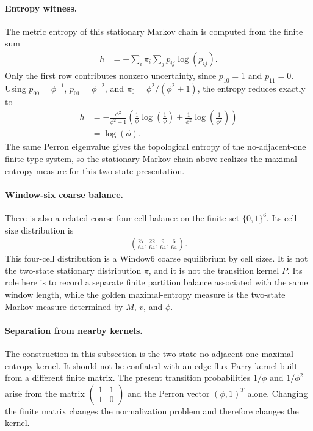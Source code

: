 \paragraph{Entropy witness.}
The metric entropy of this stationary Markov chain is computed from the finite sum
$$
\begin{aligned}
h&=-\sum_i \pi_i\sum_j p_{ij}\log(p_{ij}).
\end{aligned}
$$
Only the first row contributes nonzero uncertainty, since $p_{10}=1$ and $p_{11}=0$.  Using $p_{00}=\phi^{-1}$, $p_{01}=\phi^{-2}$, and $\pi_0=\phi^2/(\phi^2+1)$, the entropy reduces exactly to
$$
\begin{aligned}
h
&=-\frac{\phi^2}{\phi^2+1}\left(\frac{1}{\phi}\log\left(\frac{1}{\phi}\right)+\frac{1}{\phi^2}\log\left(\frac{1}{\phi^2}\right)\right) \\
&=\log(\phi).
\end{aligned}
$$
The same Perron eigenvalue gives the topological entropy of the no-adjacent-one finite type system, so the stationary Markov chain above realizes the maximal-entropy measure for this two-state presentation.

\paragraph{Window-six coarse balance.}
There is also a related coarse four-cell balance on the finite set $\{0,1\}^6$.  Its cell-size distribution is
$$
\begin{aligned}
\left(\frac{27}{64},\frac{22}{64},\frac{9}{64},\frac{6}{64}\right).
\end{aligned}
$$
This four-cell distribution is a Window6 coarse equilibrium by cell sizes.  It is not the two-state stationary distribution $\pi$, and it is not the transition kernel $P$.  Its role here is to record a separate finite partition balance associated with the same window length, while the golden maximal-entropy measure is the two-state Markov measure determined by $M$, $v$, and $\phi$.

\paragraph{Separation from nearby kernels.}
The construction in this subsection is the two-state no-adjacent-one maximal-entropy kernel.  It should not be conflated with an edge-flux Parry kernel built from a different finite matrix.  The present transition probabilities $1/\phi$ and $1/\phi^2$ arise from the matrix $\begin{pmatrix}1&1\\1&0\end{pmatrix}$ and the Perron vector $(\phi,1)^T$ alone.  Changing the finite matrix changes the normalization problem and therefore changes the kernel.

